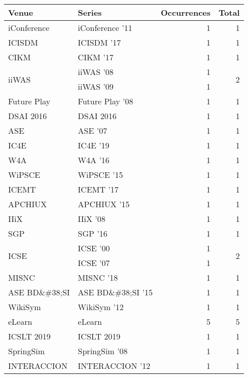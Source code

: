 \begin{table*}[t]
\begin{tabular}{llrr}
Venue & Series & Occurrences & Total\\\hline
\multirow{1}{*}{iConference } & iConference '11 & 1 & \multirow{1}{*}{1}\\
\multirow{1}{*}{ICISDM } & ICISDM '17 & 1 & \multirow{1}{*}{1}\\
\multirow{1}{*}{CIKM } & CIKM '17 & 1 & \multirow{1}{*}{1}\\
\multirow{2}{*}{iiWAS } & iiWAS '08 & 1 & \multirow{2}{*}{2}\\
& iiWAS '09 & 1 &\\
\multirow{1}{*}{Future Play } & Future Play '08 & 1 & \multirow{1}{*}{1}\\
\multirow{1}{*}{DSAI 2016} & DSAI 2016 & 1 & \multirow{1}{*}{1}\\
\multirow{1}{*}{ASE } & ASE '07 & 1 & \multirow{1}{*}{1}\\
\multirow{1}{*}{IC4E } & IC4E '19 & 1 & \multirow{1}{*}{1}\\
\multirow{1}{*}{W4A } & W4A '16 & 1 & \multirow{1}{*}{1}\\
\multirow{1}{*}{WiPSCE } & WiPSCE '15 & 1 & \multirow{1}{*}{1}\\
\multirow{1}{*}{ICEMT } & ICEMT '17 & 1 & \multirow{1}{*}{1}\\
\multirow{1}{*}{APCHIUX } & APCHIUX '15 & 1 & \multirow{1}{*}{1}\\
\multirow{1}{*}{IIiX } & IIiX '08 & 1 & \multirow{1}{*}{1}\\
\multirow{1}{*}{SGP } & SGP '16 & 1 & \multirow{1}{*}{1}\\
\multirow{2}{*}{ICSE } & ICSE '00 & 1 & \multirow{2}{*}{2}\\
& ICSE '07 & 1 &\\
\multirow{1}{*}{MISNC } & MISNC '18 & 1 & \multirow{1}{*}{1}\\
\multirow{1}{*}{ASE BD\&\#38;SI } & ASE BD\&\#38;SI '15 & 1 & \multirow{1}{*}{1}\\
\multirow{1}{*}{WikiSym } & WikiSym '12 & 1 & \multirow{1}{*}{1}\\
\multirow{1}{*}{eLearn} & eLearn & 5 & \multirow{1}{*}{5}\\
\multirow{1}{*}{ICSLT 2019} & ICSLT 2019 & 1 & \multirow{1}{*}{1}\\
\multirow{1}{*}{SpringSim } & SpringSim '08 & 1 & \multirow{1}{*}{1}\\
\multirow{1}{*}{INTERACCION } & INTERACCION '12 & 1 & \multirow{1}{*}{1}\\

\end{tabular}
\end{table*}
